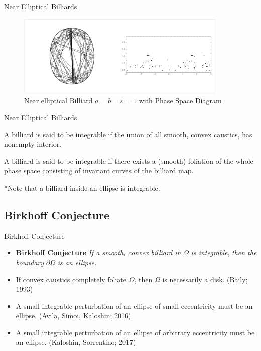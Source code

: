 \documentclass{beamer}
\begin{document}
\begin{frame}{Near Elliptical Billiards}
  \begin{figure}
    \centering
    \includegraphics[width = 0.9\textwidth]{NearellipsePhaseSpace}
    \caption{Near elliptical Billiard $a=b=\varepsilon = 1$ with Phase Space Diagram}
  \end{figure}
\end{frame}

\begin{frame}{Near Elliptical Billiards}
\begin{definition}
A billiard is said to be \alert{integrable} if the union of all smooth, convex caustics, has nonempty interior.
\end{definition}
\begin{definition}
A billiard is said to be \alert{integrable} if there exists a (smooth) foliation of the whole phase space consisting of invariant
curves of the billiard map.
\end{definition}

*Note that a billiard inside an ellipse is integrable.

\end{frame}

\subsection{Birkhoff Conjecture}

\begin{frame}{Birkhoff Conjecture}
  \begin{itemize}
  \item {
    \textbf{Birkhoff Conjecture} \textit{If a smooth, convex billiard in }$\Omega$ \textit{ is integrable}, \textit{then the boundary } $\partial\Omega$ \textit{ is an ellipse.}
    \pause %
  }
  \item {   
    If convex caustics completely foliate $\Omega$, then $\Omega$ is necessarily a disk. (Baily; 1993)
  }
  \item<3-> {
    A small integrable perturbation of an ellipse of small eccentricity must be an ellipse. (Avila, Simoi, Kaloshin; 2016)
  }
  \item<4-> {
    A small integrable perturbation of an ellipse of arbitrary eccentricity must be an ellipse. (Kaloshin, Sorrentino; 2017)
  }
  \end{itemize}
\end{frame}
\end{document}

